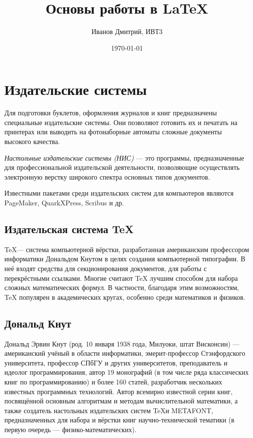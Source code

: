 \documentclass[a4paper,12pt]{article} %
\author{Иванов Дмитрий, ИВТ3}
\title{Основы работы в \LaTeX{}}
\date{\today}
\begin{document}

\maketitle
\newpage

\section{Издательские системы}
Для подготовки буклетов, оформления журналов и книг предназначены специальные издательские системы. Они позволяют готовить их и печатать на принтерах или выводить на фотонаборные автоматы сложные документы высокого качества.

\textit{Настольные издательские системы (НИС)} — это программы, предназначенные для профессиональной издательской деятельности, позволяющие осуществлять электронную верстку широкого спектра основных типов документов.

Известными пакетами среди издательских систем для компьютеров являются PageMaker, QuarkXPress, Scribus и др.

\subsection{Издательская система TeX}
\TeX — система компьютерной вёрстки, разработанная американским профессором информатики Дональдом Кнутом в целях создания компьютерной типографии. В неё входят средства для секционирования документов, для работы с перекрёстными ссылками. Многие считают TeX лучшим способом для набора сложных математических формул. В частности, благодаря этим возможностям, TeX популярен в академических кругах, особенно среди математиков и физиков.

\subsection{Дональд Кнут}
Дональд Эрвин Кнут (род. 10 января 1938 года, Милуоки, штат Висконсин) — американский учёный в области информатики, эмерит-профессор Стэнфордского университета, профессор СПбГУ и других университетов, преподаватель и идеолог программирования, автор 19 монографий (в том числе ряда классических книг по программированию) и более 160 статей, разработчик нескольких известных программных технологий. Автор всемирно известной серии книг, посвящённой основным алгоритмам и методам вычислительной математики, а также создатель настольных издательских систем \TeX и METAFONT, предназначенных для набора и вёрстки книг научно-технической тематики (в первую очередь — физико-математических).
\end{document}

